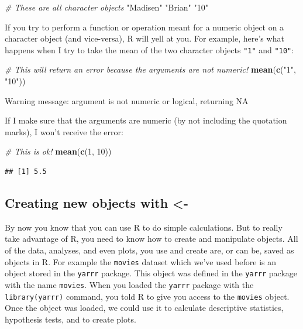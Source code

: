 \documentclass[
]{book}
\newenvironment{Shaded}{\begin{snugshade}}{\end{snugshade}}
\newcommand{\CommentTok}[1]{\textcolor[rgb]{0.56,0.35,0.01}{\textit{#1}}}
\newcommand{\DecValTok}[1]{\textcolor[rgb]{0.00,0.00,0.81}{#1}}
\newcommand{\KeywordTok}[1]{\textcolor[rgb]{0.13,0.29,0.53}{\textbf{#1}}}
\newcommand{\NormalTok}[1]{#1}
\newcommand{\StringTok}[1]{\textcolor[rgb]{0.31,0.60,0.02}{#1}}
\begin{document}
\begin{Shaded}
\begin{Highlighting}[]
\CommentTok{# These are all character objects}
\StringTok{"Madisen"}
\StringTok{"Brian"}
\StringTok{"10"}
\end{Highlighting}
\end{Shaded}

If you try to perform a function or operation meant for a numeric object on a character object (and vice-versa), R will yell at you. For example, here's what happens when I try to take the mean of the two character objects \texttt{"1"} and \texttt{"10"}:

\begin{Shaded}
\begin{Highlighting}[]
\CommentTok{# This will return an error because the arguments are not numeric!}
\KeywordTok{mean}\NormalTok{(}\KeywordTok{c}\NormalTok{(}\StringTok{"1"}\NormalTok{, }\StringTok{"10"}\NormalTok{))}
\end{Highlighting}
\end{Shaded}

\begin{error}

Warning message: argument is not numeric or logical, returning NA

\end{error}

If I make sure that the arguments are numeric (by not including the quotation marks), I won't receive the error:

\begin{Shaded}
\begin{Highlighting}[]
\CommentTok{# This is ok!}
\KeywordTok{mean}\NormalTok{(}\KeywordTok{c}\NormalTok{(}\DecValTok{1}\NormalTok{, }\DecValTok{10}\NormalTok{))}
\end{Highlighting}
\end{Shaded}

\begin{verbatim}
## [1] 5.5
\end{verbatim}

\hypertarget{creating-new-objects-with--}{%
\subsection{Creating new objects with \textless-}\label{creating-new-objects-with--}}

By now you know that you can use R to do simple calculations. But to really take advantage of R, you need to know how to create and manipulate objects. All of the data, analyses, and even plots, you use and create are, or can be, saved as objects in R. For example the \texttt{movies} dataset which we've used before is an object stored in the \texttt{yarrr} package. This object was defined in the \texttt{yarrr} package with the name \texttt{movies}. When you loaded the \texttt{yarrr} package with the \texttt{library(\textquotesingle{}yarrr\textquotesingle{})} command, you told R to give you access to the \texttt{movies} object. Once the object was loaded, we could use it to calculate descriptive statistics, hypothesis tests, and to create plots.
\end{document}
